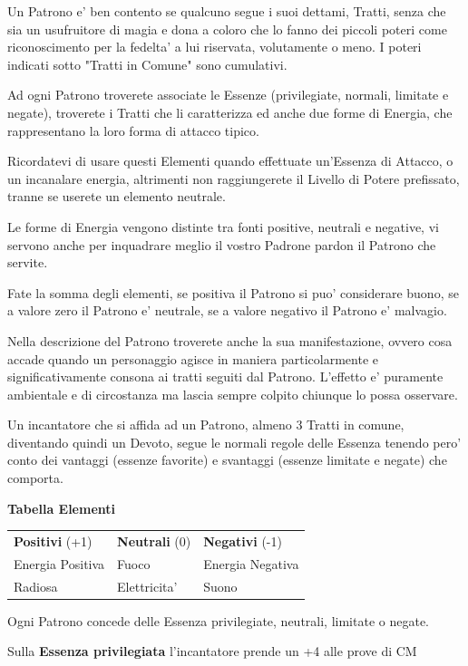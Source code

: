 \documentclass[a4paper,11pt,twoside,openany]{book}
\begin{document}
{Un Patrono e' ben contento se qualcuno segue i suoi dettami, Tratti, senza che sia un usufruitore di magia e dona a coloro che lo fanno dei piccoli poteri come riconoscimento per la fedelta' a lui riservata, volutamente o meno. I poteri indicati sotto "Tratti in Comune" sono cumulativi.

Ad ogni Patrono troverete associate le Essenze (privilegiate, normali, limitate e negate), troverete i Tratti che li caratterizza ed anche due forme di Energia, che rappresentano la loro forma di attacco tipico. 

Ricordatevi di usare questi Elementi quando effettuate un'Essenza di Attacco, o un incanalare energia, altrimenti non raggiungerete il Livello di Potere prefissato, tranne se userete un elemento neutrale. 

Le forme di Energia vengono distinte tra fonti positive, neutrali e negative, vi servono anche per inquadrare meglio il vostro Padrone pardon il Patrono che servite.

Fate la somma degli elementi, se positiva il Patrono si puo' considerare buono, se a valore zero il Patrono e' neutrale, se a valore negativo il Patrono e' malvagio.

Nella descrizione del Patrono troverete anche la sua manifestazione, ovvero cosa accade quando un personaggio agisce in maniera particolarmente e significativamente consona ai tratti seguiti dal Patrono. L'effetto e' puramente ambientale e di circostanza ma lascia sempre colpito chiunque lo possa osservare.

Un incantatore che si affida ad un Patrono, almeno 3 Tratti in comune, diventando quindi un Devoto, segue le normali regole delle Essenza tenendo pero' conto dei vantaggi (essenze favorite) e svantaggi (essenze limitate e negate) che comporta.

\bigskip

\textbf{Tabella Elementi}
\medskip

\begin{tabular}{lll}
\toprule
\textbf{Positivi} (+1) & \textbf{Neutrali} (0) & \textbf{Negativi} (-1)\tabularnewline
Energia Positiva & Fuoco & Energia Negativa\tabularnewline
Radiosa & Elettricita' & Suono\tabularnewline
\end{tabular}
\bigskip

Ogni Patrono concede delle Essenza privilegiate, neutrali, limitate o negate.

Sulla \textbf{Essenza privilegiata} l'incantatore prende un +4 alle prove di CM

}
\end{document}
